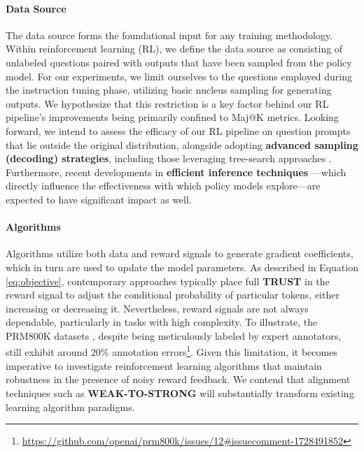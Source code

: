 \begin{itemize}[topsep=0pt]
\paragraph{Data Source} The data source forms the foundational input for any training methodology. Within reinforcement learning (RL), we define the data source as consisting of unlabeled questions paired with outputs that have been sampled from the policy model. For our experiments, we limit ourselves to the questions employed during the instruction tuning phase, utilizing basic nucleus sampling for generating outputs. We hypothesize that this restriction is a key factor behind our RL pipeline's improvements being primarily confined to Maj@K metrics. Looking forward, we intend to assess the efficacy of our RL pipeline on question prompts that lie outside the original distribution, alongside adopting \textbf{advanced sampling (decoding) strategies}, including those leveraging tree-search approaches \citep{yao2023tree}. Furthermore, recent developments in \textbf{efficient inference techniques} \citep{xia-etal-2023-speculative,leviathan2023fast,kwon2023efficient,xia2024unlocking}—which directly influence the effectiveness with which policy models explore—are expected to have significant impact as well.

\paragraph{Algorithms} Algorithms utilize both data and reward signals to generate gradient coefficients, which in turn are used to update the model parameters. As described in Equation \ref{eq:objective}, contemporary approaches typically place full \textbf{TRUST} in the reward signal to adjust the conditional probability of particular tokens, either increasing or decreasing it. Nevertheless, reward signals are not always dependable, particularly in tasks with high complexity. To illustrate, the PRM800K datasets \citep{lightman2023let}, despite being meticulously labeled by expert annotators, still exhibit around 20\% annotation errors\footnote{\url{https://github.com/openai/prm800k/issues/12\#issuecomment-1728491852}}. Given this limitation, it becomes imperative to investigate reinforcement learning algorithms that maintain robustness in the presence of noisy reward feedback. We contend that alignment techniques such as \textbf{WEAK-TO-STRONG} \citep{burns2023weak} will substantially transform existing learning algorithm paradigms.


\end{itemize}
